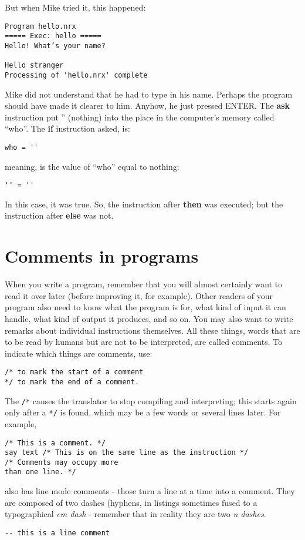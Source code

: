 {But when Mike tried it, this happened:
\begin{verbatim}
Program hello.nrx
===== Exec: hello =====
Hello! What’s your name?

Hello stranger
Processing of 'hello.nrx' complete
\end{verbatim}
Mike did not understand that he had to type in his name. Perhaps the
program should have made it clearer to him. Anyhow, he just pressed
ENTER. The \textbf{ask} instruction put '' (nothing) into the place in the
computer's memory called ``who''. The \textbf{if} instruction asked, is:
\begin{verbatim}
who = ''
\end{verbatim}
meaning, is the value of ``who'' equal to nothing:
\begin{verbatim}
'' = ''
\end{verbatim}
 
In this case, it was true. So, the instruction after \textbf{then} was
executed; but the instruction after \textbf{else} was not.

\section{Comments in programs}
When you write a program, remember that you will almost certainly want to read it over later (before improving it, for example). Other readers of your program also need to know what the program is for, what kind of input it can handle, what kind of output it produces, and so on. You may also want to write remarks about individual instructions themselves. All these things, words that are to be read by humans but are not to be interpreted, are called comments.
To indicate which things are comments, use:
\begin{verbatim}
/* to mark the start of a comment 
*/ to mark the end of a comment.
\end{verbatim}
The \texttt{/*} causes the translator to stop compiling and interpreting;
this starts again only after a \texttt{*/} is found, which may
be a few words or several lines later. For example,
\begin{verbatim}
/* This is a comment. */
say text /* This is on the same line as the instruction */
/* Comments may occupy more
than one line. */

\end{verbatim}
\nr{} also has line mode comments - those turn a line at a time into
a comment. They are composed of two dashes (hyphens, in listings sometimes
fused to a typographical \emph{em dash} - remember that in reality
they are two \emph{n dashes}.
\begin{verbatim}
-- this is a line comment
\end{verbatim}
}
